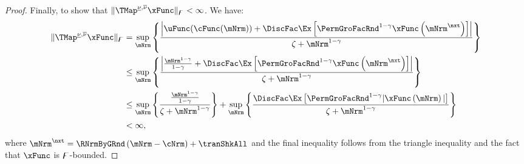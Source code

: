 \documentclass[\econtexRoot/BufferStockTheory]{subfiles}
\begin{document}
\begin{proof}
Finally, to show that $\Vert \TMap^{\MPCminInf, \MPCmaxInf}{\mathfrak{\xFunc}}\Vert_{\boundFunc}<\infty$.
We have:
%
%
\begin{equation}\begin{gathered}\begin{aligned}
\Vert \TMap^{\MPCminInf, \MPCmaxInf}{\mathfrak{\xFunc}}\Vert_{\boundFunc} & = \sup_{\mNrm} \left\{\frac{\left| \uFunc(\cFunc(\mNrm)) + \DiscFac \Ex\left[ {\PermGroFacRnd}^{1-\CRRA }{\mathfrak{\xFunc}} \left( {\mNrm^{\nxt}}\right) \right] \right|}{\zeta + \mNrm^{1-\CRRA}}\right\} \\
& \leq  \sup_{\mNrm} \left\{\frac{\left| \frac{\mNrm^{1-\CRRA}}{1-\CRRA} + \DiscFac \Ex\left[ {\PermGroFacRnd}^{1-\CRRA }{\mathfrak{\xFunc}} \left( {\mNrm^{\nxt}}\right) \right] \right|}{\zeta + \mNrm^{1-\CRRA}}\right\} \\ 
& \leq \sup_{\mNrm} \left\{\frac{\frac{\mNrm^{1-\CRRA}}{1-\CRRA}}{\zeta + \mNrm^{1-\CRRA}}\right\} + \sup_{\mNrm} \left\{\frac{\DiscFac \Ex\left[ {\PermGroFacRnd}^{1-\CRRA }{\vert \mathfrak{\xFunc}} \left( {\mNrm}\right)\vert  \right]}{\zeta + \mNrm^{1-\CRRA}}\right\}\\
& <\infty, 
\end{aligned}\end{gathered}\end{equation}
%
where ${\mNrm}^{\nxt} = \RNrmByGRnd\left(\mNrm - \cNrm\right) + \tranShkAll$ and the final inequality follows from the triangle inequality and the fact that $\xFunc$ is $\digamma$-bounded.

                                           
\end{proof}
\end{document}
